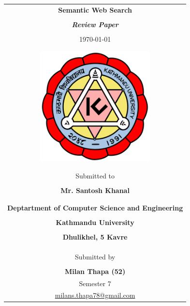 \thispagestyle{empty}

\makeatletter
\setlength\@fptop{0pt}
\setlength{}
\setlength\@fpbot{0pt}
\makeatother

\begin{table}[t]
  \begin{tabular}{c}
      \Huge{\bf{Semantic Web Search}} \\\\
      \large{\textit{\bf Review Paper}}\\\\
      \today\\\\\\
      
      \includegraphics[height=6cm]{./img/ku_logo.png}\\\\\\

      \large{Submitted to}\\\\
      \Large{\bf Mr. Santosh Khanal}\\\\\\
      \large{\bf Deptartment of Computer Science and Engineering}\\\\
      \large{\bf Kathmandu University}\\\\
      \large{\bf Dhulikhel, 5 Kavre}\\\\ \\\\      

      \large{Submitted by} \\\\
      \Large{\bf Milan Thapa (52)}\\
      \large{Semester 7}\\
      \large {\href{mailto:milans.thapa78@gmail.com}{milans.thapa78@gmail.com}}
      

\end{tabular}  
\end{table}
